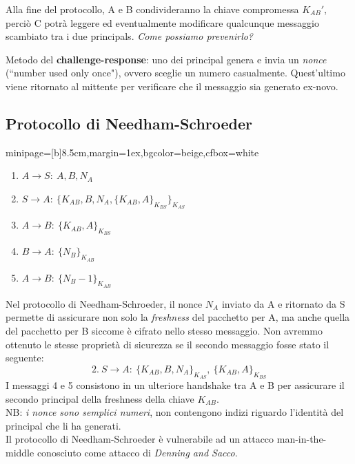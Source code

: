 \documentclass[a4paper, 11pt, twoside, openright, fleqn]{report}
\newcommand{\fromto}[2]{#1\rightarrow #2\!:\ }
\newenvironment{colbox}[2]%
{%
	\par\noindent\hspace{10pt}
	\begin{adjustbox}{minipage=[b]{#2},margin=1ex,bgcolor=#1,cfbox=white}
}{%
	\end{adjustbox}\newline%
}
\begin{document}
Alla fine del protocollo, A e B condivideranno la chiave compromessa $K_{AB}'$, perciò C potrà leggere ed eventualmente modificare qualcunque messaggio scambiato tra i due principals.
\emph{Come possiamo prevenirlo?}

Metodo del \textbf{challenge-response}: uno dei principal genera e invia un \emph{nonce} (``number used only once"), ovvero sceglie un numero casualmente. Quest'ultimo viene ritornato al mittente per verificare che il messaggio sia generato ex-novo.

\subsection{Protocollo di Needham-Schroeder}\label{sec:NSSK}
\begin{colbox}{beige}{8.5cm}
	\begin{enumerate}
		\item $\fromto{A}{S}A, B, N_A$
		\item $\fromto{S}{A}\{K_{AB},B,N_A,\{K_{AB},A\}_{K_{BS}}\}_{K_{AS}}$
		\item $\fromto{A}{B}\{K_{AB},A\}_{K_{BS}}$
		\item $\fromto{B}{A}\{N_B\}_{K_{AB}}$
		\item $\fromto{A}{B}\{N_B-1\}_{K_{AB}}$
	\end{enumerate}
\end{colbox}

Nel protocollo di Needham-Schroeder, il nonce $N_A$ inviato da A e ritornato da S permette di assicurare non solo la \emph{freshness} del pacchetto per A, ma anche quella del pacchetto per B siccome è cifrato nello stesso messaggio. Non avremmo ottenuto le stesse proprietà di sicurezza se il secondo messaggio fosse stato il seguente:
\begin{equation*}
	2.\ S\rightarrow A\!:\ \{K_{AB},B,N_A\}_{K_{AS}},\ \{K_{AB},A\}_{K_{BS}}
\end{equation*}
I messaggi 4 e 5 consistono in un ulteriore handshake tra A e B per assicurare il secondo principal della freshness della chiave $K_{AB}$.\\
NB: \emph{i nonce sono semplici numeri}, non contengono indizi riguardo l'identità del principal che li ha generati.\\

Il protocollo di Needham-Schroeder è vulnerabile ad un attacco man-in-the-middle conosciuto come attacco di \emph{Denning and Sacco}.
\end{document}
